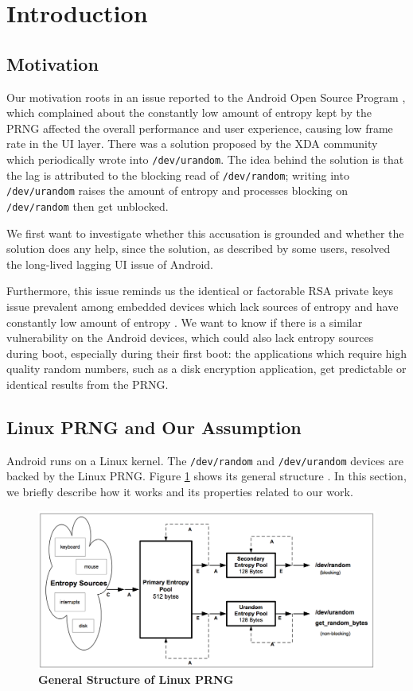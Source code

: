 \section{Introduction}
\subsection{Motivation}

Our motivation roots in an issue reported to the Android Open Source Program \cite{issue42265} , which complained about the constantly low amount of entropy kept by the PRNG affected the overall performance and user experience, causing low frame rate in the UI layer. There was a solution proposed by the XDA community which periodically wrote into \verb|/dev/urandom|. The idea behind the solution is that the lag is attributed to the blocking read of \verb|/dev/random|; writing into \verb|/dev/urandom| raises the amount of entropy and processes blocking on \verb|/dev/random| then get unblocked. 

We first want to investigate whether this accusation is grounded and whether the solution does any help, since the solution, as described by some users, resolved the long-lived lagging UI issue of Android.

Furthermore, this issue reminds us the identical or factorable RSA private keys issue prevalent among embedded devices which lack sources of entropy and have constantly low amount of entropy \cite{weakkeys12}. We want to know if there is a similar vulnerability on the Android devices, which could also lack entropy sources during boot, especially during their first boot: the applications which require high quality random numbers, such as a disk encryption application,  get predictable or identical results from the PRNG.

\subsection{Linux PRNG and Our Assumption}
Android runs on a Linux kernel. The \verb|/dev/random| and \verb|/dev/urandom| devices are backed by the Linux PRNG. Figure \ref{figprng} shows its general structure \cite{Gutterman06}. In this section, we briefly describe how it works and its properties related to our work.

\begin{figure}[t]
\begin{center}
\includegraphics[scale=0.27]{prng.png}
\end{center}
\caption{{\bf General Structure of Linux PRNG}}
\label{figprng}
\end{figure}


